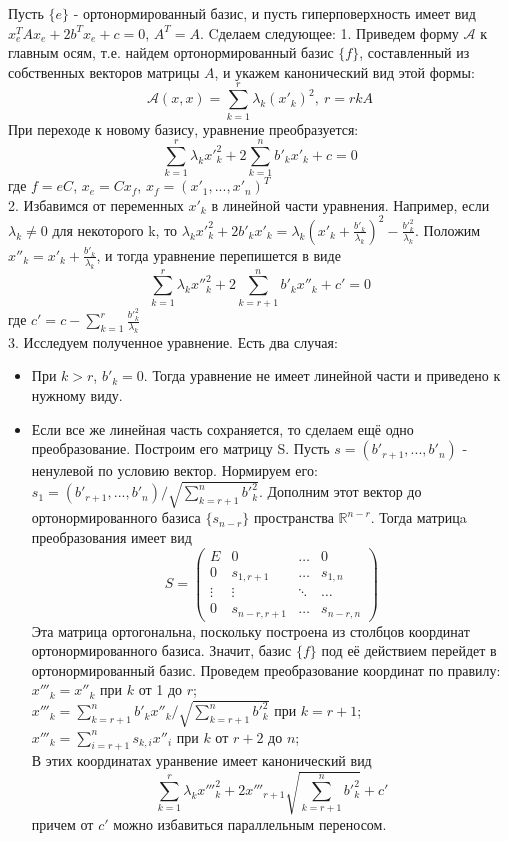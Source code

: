 Пусть $\{e\}$ - ортонормированный базис, и пусть
гиперповерхность имеет вид $x^T_eAx_e+2b^Tx_e+c=0$, $A^T=A$.
Cделаем следующее:
1. Приведем форму $\mathcal A$ к главным осям, т.е. найдем ортонормированный
базис $\{f\}$, составленный из собственных векторов матрицы $A$, и укажем 
канонический вид этой формы:
$$\mathcal A(x,x)=\sum^r_{k=1}\lambda_k(x'_k)^2,~r=rkA$$
При переходе к новому базису, уравнение преобразуется:
$$\sum^r_{k=1}\lambda_kx'^2_k+2\sum^n_{k=1}b'_kx'_k+c=0$$
где $f=eC$, $x_e=Cx_f$, $x_f=(x'_1,...,x'_n)^T$ \\
2. Избавимся от переменных $x'_k$ в линейной части уравнения. Например, если
$\lambda_k\ne0$ для некоторого k, то
$\lambda_kx'^2_k+2b'_kx'_k=\lambda_k(x'_k+\frac{b'_k}{\lambda_k})^2-
\frac{b'^2_k}{\lambda_k}$. Положим $x''_k=x'_k+\frac{b'_k}{\lambda_k}$, и 
тогда уравнение перепишется в виде 
$$\sum\limits^r_{k=1}\lambda_kx''^2_k+2\sum\limits^n_{k=r+1}b'_kx''_k+c'=0$$
где $c'=c-\sum\limits_{k=1}^r\frac{b'^2_k}{\lambda_k}$\\
3. Исследуем полученное уравнение. Есть два случая:
\begin{itemize}
    \item При $k>r$, $b'_k=0$. Тогда уравнение не имеет линейной части и 
			приведено к нужному виду.
    \item Если все же линейная часть сохраняется, то сделаем ещё одно 
			преобразование. Построим его матрицу S. Пусть 
			$s=(b'_{r+1},...,b'_n)$ - ненулевой по условию вектор. Нормируем его:
    $s_1=(b'_{r+1},...,b'_n)/\sqrt{\sum\limits^n_{k=r+1}b'^2_k}$. Дополним
	этот вектор до ортонормированного базиса
    $\{s_{n-r}\}$ пространства $\mathbb R^{n-r}$. Тогда матрицa преобразования 
	имеет вид
    $$S=\begin{pmatrix}\boxed{E}&0&\ldots&0\\0&s_{1,r+1}&\ldots&s_{1,n}\\
	\vdots&\vdots&\ddots&\ldots\\0&s_{n-r,r+1}&\ldots&s_{n-r,n}\end{pmatrix}$$
    Эта матрица ортогональна, поскольку построена из столбцов координат 
	ортонормированного базиса. Значит, базис $\{f\}$ под её действием перейдет
	в ортонормированный базис. Проведем преобразование координат по правилу:\\
    $x'''_k=x''_k$ при $k$ от 1 до $r$;\\
    $x'''_k=\sum\limits^n_{k=r+1}b'_kx''_k/\sqrt{\sum\limits^n_{k=r+1}b'^2_k}$
	при $k=r+1$;\\
    $x'''_k=\sum\limits^n_{i=r+1}s_{k,i}x''_i$ при $k$ от $r+2$ до $n$;\\
    В этих координатах уранвение имеет канонический вид
    $$\sum\limits^r_{k=1}\lambda_kx'''^2_k+2x'''_{r+1}
	\sqrt{\sum\limits^n_{k=r+1}b'^2_k}+c'$$
    причем от $c'$ можно избавиться параллельным переносом. 
    
\end{itemize}
